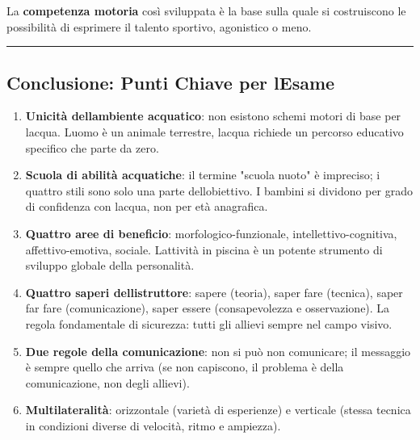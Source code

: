 \documentclass[a4paper,11pt]{article}
\begin{document}
La \textbf{competenza motoria} così sviluppata è la base sulla quale si
costruiscono le possibilità di esprimere il talento sportivo, agonistico
o meno.

\begin{center}\rule{0.5\linewidth}{0.5pt}\end{center}

\subsection{Conclusione: Punti Chiave per
      l\textquotesingle Esame}\label{conclusione-punti-chiave-per-lesame-5}

\begin{enumerate}
      \item
            \textbf{Unicità dell\textquotesingle ambiente acquatico}: non esistono
            schemi motori di base per l\textquotesingle acqua.
            L\textquotesingle uomo è un animale terrestre, l\textquotesingle acqua
            richiede un percorso educativo specifico che parte da zero.
      \item
            \textbf{Scuola di abilità acquatiche}: il termine "scuola nuoto" è
            impreciso; i quattro stili sono solo una parte
            dell\textquotesingle obiettivo. I bambini si dividono per grado di
            confidenza con l\textquotesingle acqua, non per età anagrafica.
      \item
            \textbf{Quattro aree di beneficio}: morfologico-funzionale,
            intellettivo-cognitiva, affettivo-emotiva, sociale.
            L\textquotesingle attività in piscina è un potente strumento di
            sviluppo globale della personalità.
      \item
            \textbf{Quattro saperi dell\textquotesingle istruttore}: sapere
            (teoria), saper fare (tecnica), saper far fare (comunicazione), saper
            essere (consapevolezza e osservazione). La regola fondamentale di
            sicurezza: tutti gli allievi sempre nel campo visivo.
      \item
            \textbf{Due regole della comunicazione}: non si può non comunicare; il
            messaggio è sempre quello che arriva (se non capiscono, il problema è
            della comunicazione, non degli allievi).
      \item
            \textbf{Multilateralità}: orizzontale (varietà di esperienze) e
            verticale (stessa tecnica in condizioni diverse di velocità, ritmo e
            ampiezza).

\end{enumerate}
\end{document}
